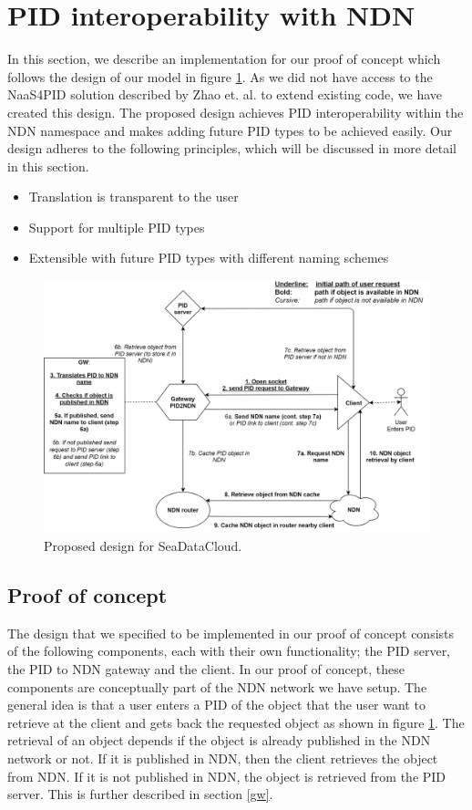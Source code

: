 \section{PID interoperability with NDN}\label{pid-poc}

In this section, we describe an implementation for our proof of concept which follows the design of our model in figure \ref{fig:sdc_model}. 
As we did not have access to the NaaS4PID solution described by Zhao et. al. to extend existing code, we have created this design. The proposed design achieves PID interoperability within the NDN namespace and makes adding future PID types to be achieved easily. Our design adheres to the following principles, which will be discussed in more detail in this section.

\begin{itemize}
    \item{Translation is transparent to the user}
    \item{Support for multiple PID types}
    \item{Extensible with future PID types with different naming schemes}
\end{itemize}

\begin{figure}[H]
\centering
\includegraphics[width=\textwidth]{Images/PIDtoNDN10.png}
\caption{Proposed design for SeaDataCloud.}
\label{fig:sdc_model}
\end{figure}

\subsection{Proof of concept}
The design that we specified to be implemented in our proof of concept consists of the following components, each with their own functionality; the PID server, the PID to NDN gateway and the client. In our proof of concept, these components are conceptually part of the NDN network we have setup. The general idea is that a user enters a PID of the object that the user want to retrieve at the client and gets back the requested object as shown in figure \ref{fig:sdc_model}. The retrieval of an object depends if the object is already published in the NDN network or not. If it is published in NDN, then the client retrieves the object from NDN. If it is not published in NDN, the object is retrieved from the PID server. This is further described in section \ref{gw}.  

